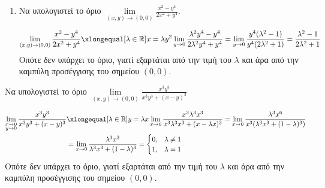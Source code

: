 \begin{examples}
\begin{enumerate}
        \item Να υπολογιστεί το όριο $ \lim\limits_{(x,y)\to (0, 0)} \frac{x^{2}-y^{4}}
            {2x^{2}+y^{4}} $. 

            \begin{solution}
                \[
                    \lim\limits_{(x,y)\to (0, 0)} \frac{x^{2}-y^{4}}
                    {2x^{2}+y^{4}} \xlongequal[\lambda \in \mathbb{R}]
                    {x= \lambda y^{2}} \lim_{y \to 0} 
                    \frac{\lambda ^{2}y^{4}-y^{4}}{2 \lambda ^{2}y^{4}+y^{4}} = 
                    \lim_{y \to 0} \frac{y^{4}(\lambda ^{2}-1)}
                    {y^{4}(2 \lambda ^{2}+1)} = 
                    \frac{\lambda ^{2}-1}{2 \lambda ^{2}+1} 
                \] 
                Οπότε δεν υπάρχει το όριο, γιατί εξαρτάται από την τιμή του $ \lambda $ 
                και άρα από την καμπύλη προσέγγισης του σημείου $ (0,0) $.
            \end{solution}
    \end{enumerate}
\end{examples}

\begin{example}
    Να υπολογιστεί το όριο $ \lim\limits_{(x,y)\to (0, 0)} \frac{x^{3}y^{3}}{x^{3}y^{3}+ (x-y)^{3}} $ 
    \begin{solution}
    \item {}
        \begin{align*}
            \lim\limits_{\substack{x \to 0\\ y \to 0}} 
            \frac{x^{3}y^{3}}{x^{3}y^{3} + (x-y)^{3}} 
    &\xlongequal[\lambda \in \mathbb{R}]{y = \lambda x} \lim_{x \to 0} 
    \frac{x^{3} \lambda ^{3} x^{3}}{x^{3} \lambda ^{3} x^{3} + (x - \lambda x)^{3}} 
    = \lim_{x \to 0} \frac{\lambda ^{3}x^{6}}{x^{3}
    (\lambda ^{3} x^{3} + (1- \lambda)^{3})} \\
    &= \lim_{x \to 0} \frac{\lambda ^{3} x^{3}}{\lambda ^{3}x^{3} + (1- \lambda)^{3}} 
    = 
    \begin{cases} 
        0, & \lambda \neq 1 \\ 
        1, & \lambda = 1 
    \end{cases} 
        \end{align*} 
        Οπότε δεν υπάρχει το όριο, γιατί εξαρτάται από την τιμή του 
        $ \lambda $ και άρα από την καμπύλη προσέγγισης του σημείου 
        $ (0,0) $.
    \end{solution}
\end{example}

